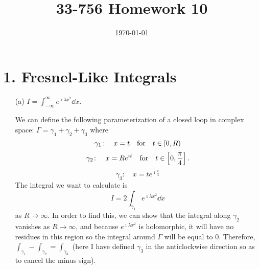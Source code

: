\documentclass[a4paper,twoside]{article}
\title{33-756 Homework 10}
\date{\today}
\begin{document}
\maketitle

\section*{1. Fresnel-Like Integrals}
\begin{itemize}
    \item[(a)] $ I = \int_{- \infty}^{\infty} e^{\imath \lambda x^2} \dd{x} $.
        \begin{problem}
            We can define the following parameterization of a closed loop in complex space: $ \Gamma = \gamma_1 + \gamma_2 + \gamma_3 $ where
            \begin{equation}
                \gamma_1\colon\quad x = t \qfor t \in [0,R)
            \end{equation}
            \begin{equation}
                \gamma_2\colon\quad x = R e^{\imath t} \qfor t \in \left[ 0, \frac{\pi}{4} \right].
            \end{equation}
            \begin{equation}
                \gamma_3\colon\quad x = t e^{\imath \frac{\pi}{4}}
            \end{equation}
            The integral we want to calculate is
            \begin{equation}
                I = 2\int_{\gamma_1} e^{\imath \lambda x^2} \dd{x}
            \end{equation}
            as $ R \to \infty $. In order to find this, we can show that the integral along $ \gamma_2 $ vanishes as $ R \to \infty $, and because $ e^{\imath \lambda x^2} $ is holomorphic, it will have no residues in this region so the integral around $ \Gamma $ will be equal to $ 0 $. Therefore, $ \int_{\gamma_1} - \int_{\gamma_2} = \int_{\gamma_3} $ (here I have defined $ \gamma_3 $ in the anticlockwise direction so as to cancel the minus sign).
            


\end{problem}
\end{itemize}
\end{document}
